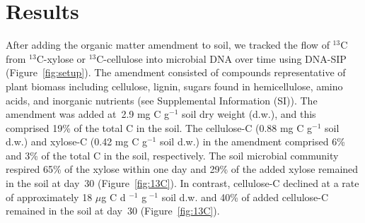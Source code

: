 \section{Results}
After adding the organic matter amendment to soil, we tracked the flow of
$^{13}$C from $^{13}$C-xylose or $^{13}$C-cellulose into microbial DNA over
time using DNA-SIP (Figure~\ref{fig:setup}). The amendment consisted of
compounds representative of plant biomass including cellulose, lignin, sugars
found in hemicellulose, amino acids, and inorganic nutrients (see Supplemental
Information (SI)). The amendment was added at~2.9 mg C g$^{-1}$ soil dry weight
(d.w.), and this comprised 19\% of the total C in the soil. The cellulose-C
(0.88 mg C g$^{-1}$ soil d.w.) and xylose-C (0.42 mg C g$^{-1}$ soil d.w.) in
the amendment comprised 6\% and 3\% of the total C in the soil, respectively.
The soil microbial community respired 65\% of the xylose within one day and
29\% of the added xylose remained in the soil at day~30 (Figure~\ref{fig:13C}).
In contrast, cellulose-C declined at a rate of approximately 18 $\mu$g
C d $^{-1}$ g $^{-1}$ soil d.w. and 40\% of added cellulose-C remained in the
soil at day~30 (Figure~\ref{fig:13C}).

